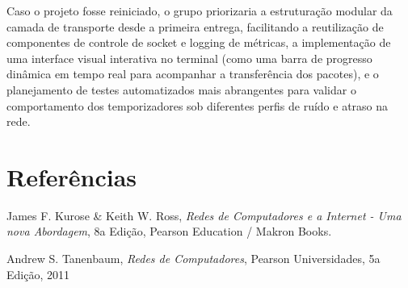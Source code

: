 \documentclass[11pt,a4paper]{article}
\begin{document}
Caso o projeto fosse reiniciado, o grupo priorizaria a estruturação modular da camada de transporte desde a primeira entrega, facilitando a reutilização de componentes de controle de socket e logging de métricas, a implementação de uma interface visual interativa no terminal (como uma barra de progresso dinâmica em tempo real para acompanhar a transferência dos pacotes), e o planejamento de testes automatizados mais abrangentes para validar o comportamento dos temporizadores sob diferentes perfis de ruído e atraso na rede.

%

\section{Referências}

\begin{referencias}
\item James F. Kurose \& Keith W. Ross, \emph{Redes de Computadores e a Internet - Uma nova Abordagem}, 8a Edição, Pearson Education / Makron Books.

\item Andrew S. Tanenbaum, \emph{Redes de Computadores}, Pearson Universidades, 5a Edição, 2011
\end{referencias}
\end{document}
